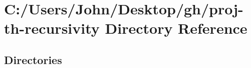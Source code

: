 \section{C\+:/\+Users/\+John/\+Desktop/gh/proj-\/th-\/recursivity Directory Reference}
\label{dir_05d1f3a794525e327b27fe28841e2223}
\subsection*{Directories}
\begin{DoxyCompactItemize}
\end{DoxyCompactItemize}
